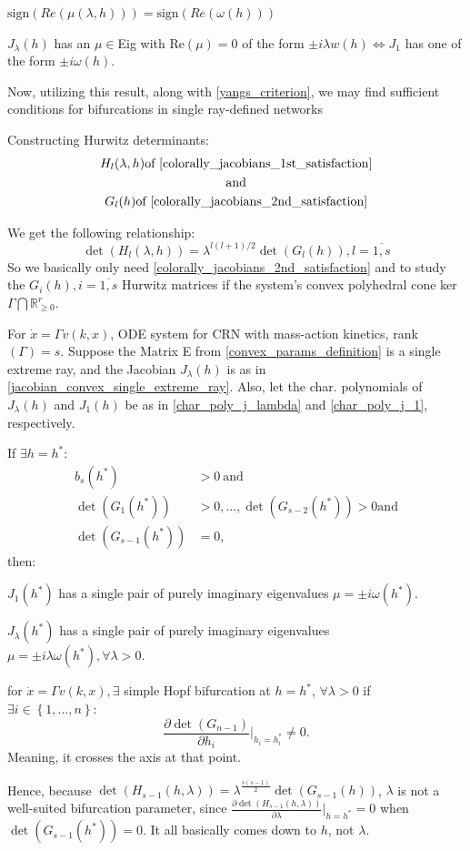  $\mathrm{sign}(Re(\mu(\lambda,h)))=\mathrm{sign}(Re(\omega(h)))$

 $J_\lambda(h)$ has an $\mu \in$Eig with Re$(\mu) = 0$ of the form $\pm i \lambda w(h) \iff J_1$ has one of the form $\pm i \omega (h)$.

Now, utilizing this result, along with \ref{yangs_criterion}, we may find sufficient conditions for bifurcations in single ray-defined networks

Constructing Hurwitz determinants:
\begin{gather*}
	H_l(\lambda, h) \text{of \ref{colorally_jacobians_1st_satisfaction}} \\
	\text{and} \\
	G_l(h) \text{of \ref{colorally_jacobians_2nd_satisfaction}}
\end{gather*}

\begin{proposition}
	We get the following relationship:
	\[
		\det\left(H_l(\lambda,h)\right)=\lambda^{l(l+1)/2}\det\left(G_l(h)\right),l=\overline{1,s}
	\]
	So we basically only need \ref{colorally_jacobians_2nd_satisfaction} and to study the $G_i(h), i = \overline{1,s}$ Hurwitz matrices if the system's convex polyhedral cone ker$\Gamma \bigcap \mathbb{R}^r_{\geq 0}$.
\end{proposition}
\begin{proposition}
	For $\dot{x} = \Gamma v(k,x)$, ODE system for CRN with mass-action kinetics, rank$(\Gamma) = s$. Suppose the Matrix E from \ref{convex_params_definition} is a single extreme ray, and the Jacobian $J_\lambda(h)$ is as in \ref{jacobian_convex_single_extreme_ray}.
	Also, let the char. polynomials of $J_\lambda(h)$ and $J_1(h)$ be as in \ref{char_poly_j_lambda} and \ref{char_poly_j_1}, respectively.

	If $\exists h = h^* :$
	\[
		\begin{aligned}
			b_s(h^*)&\mathrm{>0~and}\\\det(G_1(h^*))&>0,...,\det(G_{s-2}(h^*))>0\mathrm{and}\\\det(G_{s-1}(h^*))&=0,
		\end{aligned}
	\]
	then:

	 $J_1(h^*)$ has a single pair of purely imaginary eigenvalues $\mu = \pm i \omega(h^*)$.

	 $J_\lambda(h^*)$ has a single pair of purely imaginary eigenvalues $\mu = \pm i \lambda \omega(h^*), \forall \lambda > 0$.

	 for $\dot{x} = \Gamma v(k,x), \exists$ simple Hopf	 bifurcation at $h = h^*$, $\forall \lambda > 0$ if $\exists i \in \left\{ 1 , \ldots , n \right\}:$
	\[
		\frac{\partial\det(G_{n-1})}{\partial h_i}|_{h_i=h_i^*}\neq0.
	\]
	Meaning, it crosses the axis at that point.
\end{proposition}
Hence, because $\det(H_{s-1}(h,\lambda))=\lambda^{\frac{s(s-1)}{2}}\det(G_{s-1}(h))$, $\lambda$ is not a well-suited bifurcation parameter, since $\frac{\partial\det(H_{s-1}(h,\lambda))}{\partial\lambda}|_{h=h^{*}}=0$ when $\det(G_{s-1}(h^{*}))=0$. It all basically comes down to $h$, not $\lambda$.
\hfill\break

